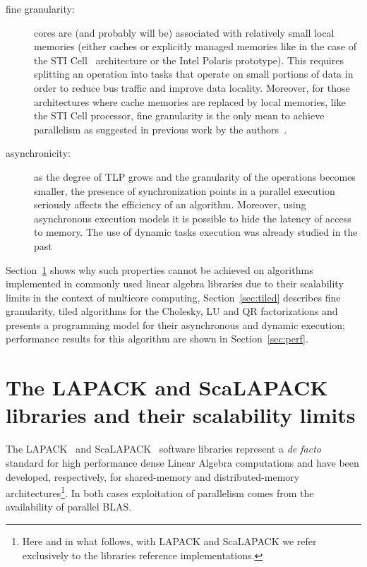 \documentclass{article}
\begin{document}
\begin{description}
\item[fine granularity:] cores are (and probably will be) associated
  with relatively small local memories (either caches or explicitly
  managed memories like in the case of the STI
  Cell~\cite{isscc_2005_cell_desing} architecture or the Intel
  Polaris\cite{polaris} prototype). This requires splitting an
  operation into tasks that operate on small portions of data in order
  to reduce bus traffic and improve data locality. Moreover, for those
  architectures where cache memories are replaced by local memories,
  like the STI Cell processor, fine granularity is the only mean to
  achieve parallelism as suggested in previous work by the authors~\cite{cell_chol}.
\item[asynchronicity:] as the degree of TLP grows and the granularity of
  the operations becomes smaller, the presence of synchronization
  points in a parallel execution seriously affects the efficiency of
  an algorithm. Moreover, using asynchronous execution models it is
  possible to hide the latency of access to memory. The use of dynamic
  tasks execution was already studied in the past~\cite{76287,essl01}
\end{description}

Section~\ref{sec:lapack} shows why  such properties cannot be achieved
on algorithms  implemented in  commonly used linear  algebra libraries
due to their scalability limits in the context of multicore computing,
Section~\ref{sec:tiled}  describes fine granularity,  tiled algorithms
for the Cholesky, LU and  QR factorizations and presents a programming
model  for  their  asynchronous  and  dynamic  execution;  performance
results for this algorithm are shown in Section~\ref{sec:perf}.

%



\section{The LAPACK and ScaLAPACK libraries and their scalability
  limits}
\label{sec:lapack}


The LAPACK~\cite{lapack:99} and ScaLAPACK~\cite{scalapack:96} software
libraries represent a {\it de facto} standard for high performance
dense Linear Algebra computations and have been developed,
respectively, for shared-memory and distributed-memory
architectures\footnote{Here and in what follows, with LAPACK and
  ScaLAPACK we refer exclusively to the libraries reference
  implementations.}. In both cases exploitation of parallelism comes
from the availability of parallel BLAS.
\end{document}
